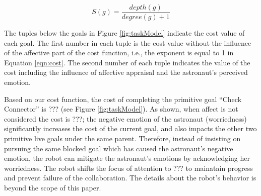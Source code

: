 \documentclass[conference]{IEEEtran}
\begin{document}
\vspace*{-2mm}
\begin{equation}
S(g) = \frac{depth(g)}{degree(g)+1}
\label{eqn:specificity}
\end{equation}

\vspace*{-1mm}
The tuples below the goals in Figure \ref{fig:taskModel} indicate the cost value
of each goal. The first number in each tuple is the cost value without the
influence of the affective part of the cost function, i.e., the exponent is
equal to 1 in Equation \ref{eqn:cost}. The second number of each tuple indicates
the value of the cost including the influence of affective appraisal and the
astronaut's perceived emotion.

Based on our cost function, the cost of completing the primitive goal ``Check
Connector'' is ??? (see Figure \ref{fig:taskModel}). As shown, when affect is
not considered the cost is ???; the negative emotion of the astronaut
(worriedness) significantly increases the cost of the current goal, and also
impacts the other two primitive live goals under the same parent. Therefore,
instead of insisting on pursuing the same blocked goal which has caused the
astronaut's negative emotion, the robot can mitigate the astronaut's emotions by
acknowledging her worriedness. The robot shifts the focus of attention to ??? to
mainatain progress and prevent failure of the collaboration. The details about
the robot's behavior is beyond the scope of this paper.

%
%
\end{document}
